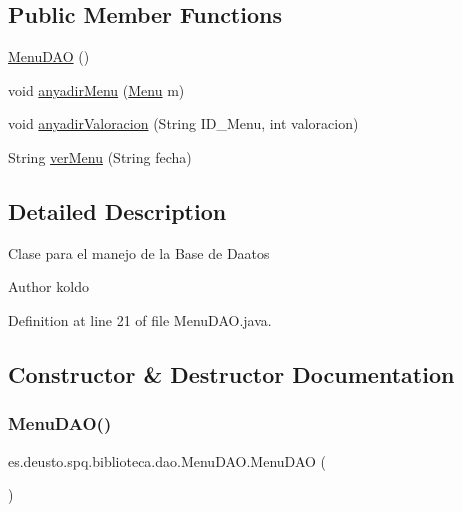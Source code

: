 \subsection*{Public Member Functions}
\begin{DoxyCompactItemize}
\item 
\mbox{\hyperlink{classes_1_1deusto_1_1spq_1_1biblioteca_1_1dao_1_1_menu_d_a_o_afe49d8c5870b1f0ce0ffb6113c97b167}{Menu\+D\+AO}} ()
\item 
void \mbox{\hyperlink{classes_1_1deusto_1_1spq_1_1biblioteca_1_1dao_1_1_menu_d_a_o_af7d7568033bc78af220f0fd5cf4a71b6}{anyadir\+Menu}} (\mbox{\hyperlink{classes_1_1deusto_1_1spq_1_1biblioteca_1_1data_1_1_menu}{Menu}} m)
\item 
void \mbox{\hyperlink{classes_1_1deusto_1_1spq_1_1biblioteca_1_1dao_1_1_menu_d_a_o_abdc102f8901cbab970e2791adf5865b9}{anyadir\+Valoracion}} (String I\+D\+\_\+\+Menu, int valoracion)
\item 
String \mbox{\hyperlink{classes_1_1deusto_1_1spq_1_1biblioteca_1_1dao_1_1_menu_d_a_o_ae05c2b05b530f98bcfc8ad1146f4efd7}{ver\+Menu}} (String fecha)
\end{DoxyCompactItemize}


\subsection{Detailed Description}
Clase para el manejo de la Base de Daatos \begin{DoxyAuthor}{Author}
koldo 
\end{DoxyAuthor}


Definition at line 21 of file Menu\+D\+A\+O.\+java.



\subsection{Constructor \& Destructor Documentation}
\mbox{\label{classes_1_1deusto_1_1spq_1_1biblioteca_1_1dao_1_1_menu_d_a_o_afe49d8c5870b1f0ce0ffb6113c97b167}} 
\subsubsection{\texorpdfstring{Menu\+D\+A\+O()}{MenuDAO()}}
{\footnotesize\ttfamily es.\+deusto.\+spq.\+biblioteca.\+dao.\+Menu\+D\+A\+O.\+Menu\+D\+AO (\begin{DoxyParamCaption}{ }\end{DoxyParamCaption})}

